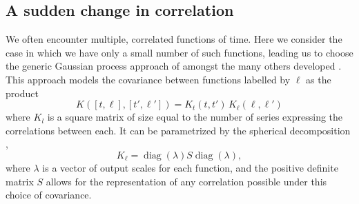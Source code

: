 \documentclass{article}
\newcommand{\deq}{\triangleq}
\newcommand{\cm}[1]{\mathcal{#1}}
\newcommand{\R}{\mathbb{R}}
\DeclareMathOperator{\diag}{diag}
\begin{document}
\subsection{A sudden change in correlation}
% 

We often encounter multiple, correlated functions of time. Here we consider the case in which we have only a small number of such functions, leading us to choose the generic Gaussian process approach of \citet{osborne2008towards} amongst the many others developed \citep{boyle2005multiple, alvarez2011computationally}. This approach models the covariance between functions labelled by $\ell$ as the product
$$
K([t,\ell],[t',\ell']) = K_t(t,t')\,K_\ell(\ell,\ell')
$$
where $K_l$ is a square matrix of size equal to the number of series expressing the correlations between each. It can be parametrized by the spherical decomposition \citep{PinheiroBates},
$$
K_\ell= \diag(\mathbb{\lambda}) S \diag(\mathbb{\lambda}),
$$
where $\mathbb{\lambda}$ is a vector of output scales for each function, and the positive definite matrix $S$ allows for the representation of any correlation possible under this choice of covariance.
\end{document}
